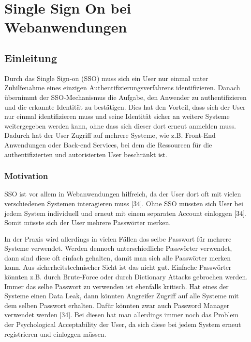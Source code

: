 \chapter{Single Sign On bei Webanwendungen}



\section{Einleitung} \label{EB_Einleitung}

Durch das Single Sign-on (SSO) muss sich ein User nur einmal unter Zuhilfenahme eines einzigen Authentifizierungsverfahrens identifizieren. Danach übernimmt der SSO-Mechanismus die Aufgabe, den Anwender zu authentifizieren und die erkannte Identität zu bestätigen. Dies hat den Vorteil, dass sich der User nur einmal identifizieren muss und seine Identität sicher an weitere Systeme weitergegeben werden kann, ohne dass sich dieser dort erneut anmelden muss. Dadurch hat der User Zugriff auf mehrere Systeme, wie z.B. Front-End Anwendungen oder Back-end Services, bei dem die Ressourcen für die authentifizierten und autorisierten User beschränkt ist. \cite{MKS2009}

\subsection{Motivation} %

SSO ist vor allem in Webanwendungen hilfreich, da der User dort oft mit vielen verschiedenen Systemen interagieren muss [34]. Ohne SSO müssten sich User bei jedem System individuell und erneut mit einem separaten Account einloggen [34]. Somit müsste sich der User mehrere Passwörter merken.

In der Praxis wird allerdings in vielen Fällen das selbe Passwort für mehrere Systeme verwendet. Werden dennoch unterschiedliche Passwörter verwendet, dann sind diese oft einfach gehalten, damit man sich alle Passwörter merken kann. Aus sicherheitstechnischer Sicht ist das nicht gut. Einfache Passwörter könnten z.B. durch Brute-Force oder durch Dictionary Attacks gebrochen werden. Immer das selbe Passwort zu verwenden ist ebenfalls kritisch. Hat eines der Systeme einen Data Leak, dann könnten Angreifer Zugriff auf alle Systeme mit dem selben Passwort erhalten. Dafür könnten zwar auch Password Manager verwendet werden [34]. Bei diesen hat man allerdings immer noch das Problem der Psychological Acceptability der User, da sich diese bei jedem System erneut registrieren und einloggen müssen.

